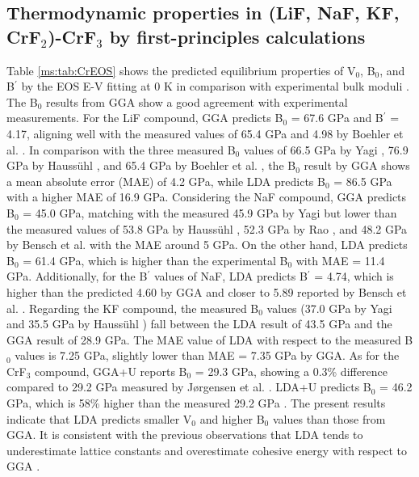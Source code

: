 \subsection{Thermodynamic properties in (LiF, NaF, KF, CrF$_2$)-CrF$_3$ by first-principles calculations} \label{moltensalts:ssec:FLiNaKCrsolids}

Table \ref{ms:tab:CrEOS} shows the predicted equilibrium properties of V$_0$, B$_0$, and B$^\prime$ by the EOS E-V fitting at 0 K in comparison with experimental bulk moduli \cite{yagi1978experimental, haussuhl1960thermo, boehler1980thermal, rao1974anderson, bensch1972third, jorgensen2004compression}. The B$_0$ results from GGA show a good agreement with experimental measurements. For the LiF compound, GGA predicts B$_0$ = 67.6 GPa and B$^\prime$ = 4.17, aligning well with the measured values of 65.4 GPa and 4.98 by Boehler et al. \cite{boehler1980thermal}. In comparison with the three measured B$_0$ values of 66.5 GPa by Yagi \cite{yagi1978experimental}, 76.9 GPa by Haussühl \cite{haussuhl1960thermo}, and 65.4 GPa by Boehler et al. \cite{boehler1980thermal}, the B$_0$ result by GGA shows a mean absolute error (MAE) of 4.2 GPa, while LDA predicts B$_0$ = 86.5 GPa with a higher MAE of 16.9 GPa. Considering the NaF compound, GGA predicts B$_0$ = 45.0 GPa, matching with the measured 45.9 GPa by Yagi \cite{yagi1978experimental} but lower than the measured values of 53.8 GPa by Haussühl \cite{haussuhl1960thermo}, 52.3 GPa by Rao \cite{rao1974anderson}, and 48.2 GPa by Bensch et al. \cite{bensch1972third} with the MAE around 5 GPa. On the other hand, LDA predicts B$_0$ = 61.4 GPa, which is higher than the experimental B$_0$ \cite{yagi1978experimental, haussuhl1960thermo, rao1974anderson, bensch1972third} with MAE = 11.4 GPa. Additionally, for the B$^\prime$ values of NaF, LDA predicts B$^\prime$ = 4.74, which is higher than the predicted 4.60 by GGA and closer to 5.89 reported by Bensch et al. \cite{bensch1972third}. Regarding the KF compound, the measured B$_0$ values (37.0 GPa by Yagi \cite{yagi1978experimental} and 35.5 GPa by Haussühl \cite{haussuhl1960thermo}) fall between the LDA result of 43.5 GPa and the GGA result of 28.9 GPa. The MAE value of LDA with respect to the measured B$_0$ values is 7.25 GPa, slightly lower than MAE = 7.35 GPa by GGA. As for the CrF$_3$ compound, GGA+U reports B$_0$ = 29.3 GPa, showing a 0.3\% difference compared to 29.2 GPa measured by Jørgensen et al. \cite{jorgensen2004compression}. LDA+U predicts B$_0$ = 46.2 GPa, which is 58\% higher than the measured 29.2 GPa \cite{jorgensen2004compression}. The present results indicate that LDA predicts smaller V$_0$ and higher B$_0$ values than those from GGA. It is consistent with the previous observations that LDA tends to underestimate lattice constants and overestimate cohesive energy with respect to GGA \cite{haas2009calculation, he2014accuracy}.

